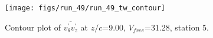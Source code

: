 \begin{figure}[H]
\centering
\texttt{[image: figs/run\_49/run\_49\_tw\_contour]}
\caption{Contour plot of $\overline{v_{\theta}^{\prime} v_{z}^{\prime}}$ at $z/c$=9.00, $V_{free}$=31.28, station 5.}
\label{fig:run_49_tw_contour}
\end{figure}


